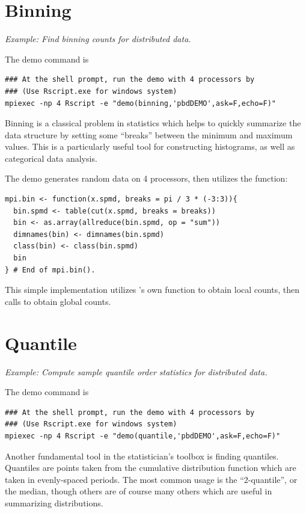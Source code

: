 \section[Binning]{Binning}
\label{sec:binning}

\emph{Example:  Find binning counts for distributed data.}

The demo command is
\begin{lstlisting}
### At the shell prompt, run the demo with 4 processors by
### (Use Rscript.exe for windows system)
mpiexec -np 4 Rscript -e "demo(binning,'pbdDEMO',ask=F,echo=F)"
\end{lstlisting}

Binning is a classical problem in statistics which helps to quickly summarize
the data structure by setting some ``breaks'' between the minimum and maximum values.
This is a particularly useful tool for constructing histograms, as well as categorical data analysis.

The demo generates random data on 4 processors, then
utilizes the  function:
\begin{lstlisting}[language=rr,title=R Code]
mpi.bin <- function(x.spmd, breaks = pi / 3 * (-3:3)){
  bin.spmd <- table(cut(x.spmd, breaks = breaks))
  bin <- as.array(allreduce(bin.spmd, op = "sum"))
  dimnames(bin) <- dimnames(bin.spmd)
  class(bin) <- class(bin.spmd)
  bin
} # End of mpi.bin().
\end{lstlisting}
This simple implementation utilizes 's own  function to obtain
local counts, then calls  to obtain global counts.


\section[Quantile]{Quantile}
\label{sec:quantile}

\emph{Example:  Compute sample quantile order statistics for distributed data.}

The demo command is
\begin{lstlisting}
### At the shell prompt, run the demo with 4 processors by
### (Use Rscript.exe for windows system)
mpiexec -np 4 Rscript -e "demo(quantile,'pbdDEMO',ask=F,echo=F)"
\end{lstlisting}

Another fundamental tool in the statistician's toolbox is finding quantiles.  Quantiles are points taken from the cumulative distribution function which are taken in evenly-spaced periods.  The most common usage is the ``2-quantile'', or the median, though others are of course many others which are useful in summarizing distributions.

